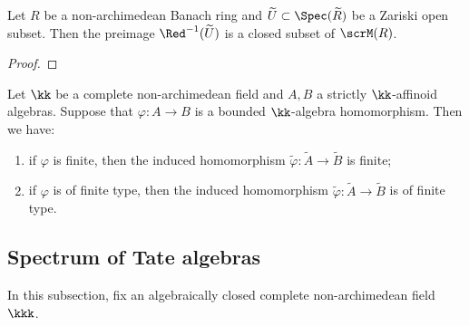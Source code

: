 \begin{example}
\begin{center}
	\end{center}
\end{example}

\begin{proposition}\label{prop:reduction_map_inverse_open_subset_to_closed_subset}
	Let \(R\) be a non-archimedean Banach ring and \(\widetilde{U} \subset \Spec(\widetilde{R})\) be a Zariski open subset.
	Then the preimage \(\Red^{-1}(\widetilde{U})\) is a closed subset of \(\scrM(R)\).
\end{proposition}
\begin{proof}
\end{proof}

\begin{proposition}\label{prop:reduction_map_of_strictly_affinoid_algebra_preserves_finiteness_and_finite_type}
	Let \(\kk\) be a complete non-archimedean field and \(A,B\) a strictly \(\kk\)-affinoid algebras.
	Suppose that \(\varphi: A \to B\) is a bounded \(\kk\)-algebra homomorphism.
	Then we have:
	\begin{enumerate}
		\item if \(\varphi\) is finite, then the induced homomorphism \(\widetilde{\varphi}: \widetilde{A} \to \widetilde{B}\) is finite;
		\item if \(\varphi\) is of finite type, then the induced homomorphism \(\widetilde{\varphi}: \widetilde{A} \to \widetilde{B}\) is of finite type.
	\end{enumerate}
\end{proposition}


\subsection{Spectrum of Tate algebras}

In this subsection, fix an algebraically closed complete non-archimedean field \(\kkk\).

